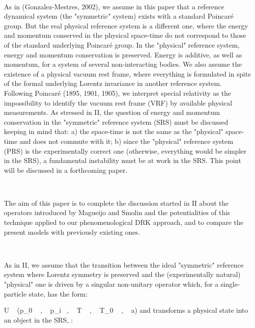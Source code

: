 \documentclass[a4paper,12pt,dvips]{article}
\begin{document}
~

As in (Gonzalez-Mestres, 2002), we assume in this paper that a reference dynamical system (the "symmetric" system) exists with a standard Poincar\'e group. But the real physical reference system is a different one, where the energy and momentum conserved in the physical space-time do not correspond to those of the standard underlying Poincar\'e group. In the "physical" reference system, energy and momentum conservation is preserved. Energy is additive, as well as momentum, for a system of several non-interacting bodies. We also assume the existence of a physical vacuum rest frame, where everything is formulated in spite of the formal underlying Lorentz invariance in another reference system. Following Poincar\'e (1895, 1901, 1905), we interpret special relativity as the impossibility to identify the vacuum rest frame (VRF) by available physical measurements. As stressed in II, the question of energy and momentum conservation in the "symmetric" reference system (SRS) must be discussed keeping in mind that: a) the space-time is not the same as the "physical" space-time and does not commute with it; b) since the "physical" reference system (PRS) is the experimentally correct one (otherwise, everything would be simpler in the SRS), a fundamental instability must be at work in the SRS. This point will be discussed in a forthcoming paper.


~

The aim of this paper is to complete the discussion started in II about the \coordHE{} operators introduced by Magueijo and Smolin and the potentialities of this technique applied to our phenomenological DRK approach, and to compare the present models with previously existing ones.


~

As in II, we assume that the transition between the ideal "symmetric" reference system where Lorentz symmetry is preserved and the (experimentally natural) "physical" one is driven by a singular non-unitary operator which, for a single-particle state, has the form:

\equation
U ~ (p_0 ~ , ~ p_i ~, ~ T ~ , ~ T_0 ~ , ~ a) 
\endequation
\noindent
and transforms a physical state \coordHE{} into an object in the SRS, \coordHE{} :
\end{document}

